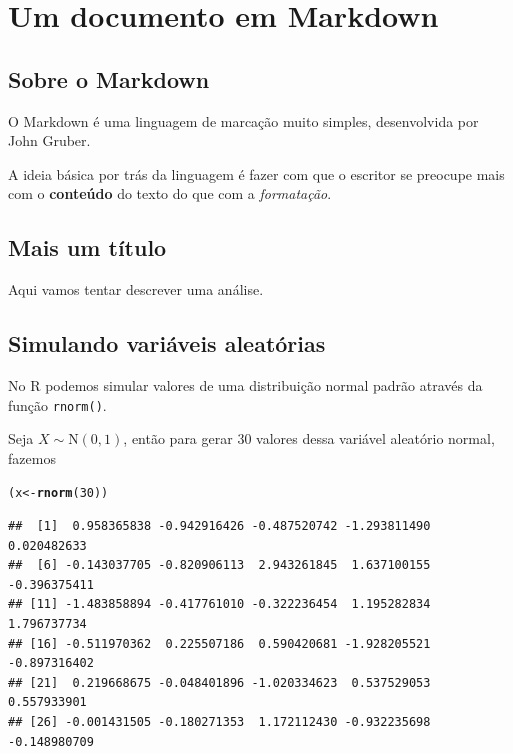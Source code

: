 \documentclass{article}\usepackage[]{graphicx}\usepackage[]{color}
\makeatletter
\newcommand{\hlnum}[1]{\textcolor[rgb]{0.686,0.059,0.569}{#1}}%
\newcommand{\hlstd}[1]{\textcolor[rgb]{0.345,0.345,0.345}{#1}}%
\newcommand{\hlkwb}[1]{\textcolor[rgb]{0.69,0.353,0.396}{#1}}%
\newcommand{\hlkwd}[1]{\textcolor[rgb]{0.737,0.353,0.396}{\textbf{#1}}}%
\newenvironment{kframe}{%
 \def\at@end@of@kframe{}%
 \ifinner\ifhmode%
  \def\at@end@of@kframe{\end{minipage}}%
  \begin{minipage}{\columnwidth}%
 \fi\fi%
 \def\FrameCommand##1{\hskip\@totalleftmargin \hskip-\fboxsep
 \colorbox{shadecolor}{##1}\hskip-\fboxsep
     \hskip-\linewidth \hskip-\@totalleftmargin \hskip\columnwidth}%
 \MakeFramed {\advance\hsize-\width
   \@totalleftmargin\z@ \linewidth\hsize
   \@setminipage}}%
 {\par\unskip\endMakeFramed%
 \at@end@of@kframe}
\newenvironment{knitrout}{}{} %
\makeatother
\begin{document}
\section{Um documento em Markdown}

\subsection{Sobre o Markdown}

O Markdown é uma linguagem de marcação muito simples, desenvolvida por
John Gruber.

A ideia básica por trás da linguagem é fazer com que o escritor se
preocupe mais com o \textbf{conteúdo} do texto do que com a
\emph{formatação}.

\subsection{Mais um título}

Aqui vamos tentar descrever uma análise.

\subsection{Simulando variáveis aleatórias}

No R podemos simular valores de uma distribuição normal padrão através
da função \texttt{rnorm()}.

Seja $X \sim \text{N}(0,1)$, então para gerar 30 valores dessa
variável aleatório normal, fazemos

\begin{knitrout}
\color{fgcolor}\begin{kframe}
\begin{alltt}
\hlstd{(x} \hlkwb{<-} \hlkwd{rnorm}\hlstd{(}\hlnum{30}\hlstd{))}
\end{alltt}
\begin{verbatim}
##  [1]  0.958365838 -0.942916426 -0.487520742 -1.293811490  0.020482633
##  [6] -0.143037705 -0.820906113  2.943261845  1.637100155 -0.396375411
## [11] -1.483858894 -0.417761010 -0.322236454  1.195282834  1.796737734
## [16] -0.511970362  0.225507186  0.590420681 -1.928205521 -0.897316402
## [21]  0.219668675 -0.048401896 -1.020334623  0.537529053  0.557933901
## [26] -0.001431505 -0.180271353  1.172112430 -0.932235698 -0.148980709
\end{verbatim}
\end{kframe}
\end{knitrout}
\end{document}
